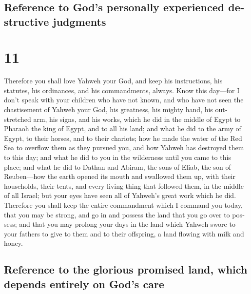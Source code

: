 \begin{paracol}{2}
\switchcolumn
\begin{otherlanguage}{english}

\hypertarget{reference-to-gods-personally-experienced-destructive-judgments}{%
\subsection{Reference to God's personally experienced destructive
judgments}\label{reference-to-gods-personally-experienced-destructive-judgments}}

\hypertarget{section-21}{%
\section{11}\label{section-21}}

 Therefore you shall love Yahweh your God, and keep his
instructions, his statutes, his ordinances, and his commandments,
always.  Know this day---for I don't speak with your
children who have not known, and who have not seen the chastisement of
Yahweh your God, his greatness, his mighty hand, his outstretched arm,
 his signs, and his works, which he did in the middle of
Egypt to Pharaoh the king of Egypt, and to all his land; 
and what he did to the army of Egypt, to their horses, and to their
chariots; how he made the water of the Red Sea to overflow them as they
pursued you, and how Yahweh has destroyed them to this day;
 and what he did to you in the wilderness until you came
to this place;  and what he did to Dathan and Abiram, the
sons of Eliab, the son of Reuben---how the earth opened its mouth and
swallowed them up, with their households, their tents, and every living
thing that followed them, in the middle of all Israel; 
but your eyes have seen all of Yahweh's great work which he did.
 Therefore you shall keep the entire commandment which I
command you today, that you may be strong, and go in and possess the
land that you go over to possess;  and that you may
prolong your days in the land which Yahweh swore to your fathers to give
to them and to their offspring, a land flowing with milk and honey.

\hypertarget{reference-to-the-glorious-promised-land-which-depends-entirely-on-gods-care}{%
\subsection{Reference to the glorious promised land, which depends
entirely on God's
care}\label{reference-to-the-glorious-promised-land-which-depends-entirely-on-gods-care}}


\end{otherlanguage}
\end{paracol}
